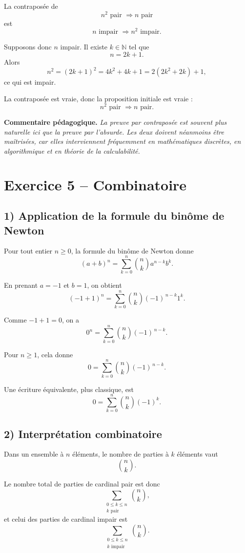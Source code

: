 \documentclass[12pt,a4paper]{article}
\newenvironment{pedago}
{\par\smallskip\noindent\textbf{Commentaire pédagogique. }\itshape}
{\par\smallskip}
\begin{document}
La contraposée de
\[
n^2\text{ pair } \Longrightarrow n\text{ pair}
\]
est
\[
n\text{ impair } \Longrightarrow n^2\text{ impair}.
\]

Supposons donc $n$ impair. Il existe $k\in\mathbb N$ tel que
\[
n=2k+1.
\]
Alors
\[
n^2=(2k+1)^2=4k^2+4k+1=2(2k^2+2k)+1,
\]
ce qui est impair.

La contraposée est vraie, donc la proposition initiale est vraie :
\[
\boxed{n^2\text{ pair } \Longrightarrow n\text{ pair}.}
\]

\begin{pedago}
La preuve par contraposée est souvent plus naturelle ici que la preuve par l'absurde. Les deux doivent néanmoins être maîtrisées, car elles interviennent fréquemment en mathématiques discrètes, en algorithmique et en théorie de la calculabilité.
\end{pedago}

\bigskip

\section*{Exercice 5 -- Combinatoire}

\subsection*{1) Application de la formule du binôme de Newton}

Pour tout entier $n\ge 0$, la formule du binôme de Newton donne
\[
(a+b)^n=\sum_{k=0}^n \binom{n}{k} a^{n-k}b^k.
\]

En prenant $a=-1$ et $b=1$, on obtient
\[
(-1+1)^n=\sum_{k=0}^n \binom{n}{k} (-1)^{\,n-k}1^k.
\]

Comme $-1+1=0$, on a
\[
0^n=\sum_{k=0}^n \binom{n}{k} (-1)^{\,n-k}.
\]

Pour $n\ge 1$, cela donne
\[
0=\sum_{k=0}^n \binom{n}{k} (-1)^{\,n-k}.
\]

Une écriture équivalente, plus classique, est
\[
0=\sum_{k=0}^n \binom{n}{k} (-1)^k.
\]

\subsection*{2) Interprétation combinatoire}

Dans un ensemble à $n$ éléments, le nombre de parties à $k$ éléments vaut
\[
\binom{n}{k}.
\]

Le nombre total de parties de cardinal pair est donc
\[
\sum_{\substack{0\le k\le n\\ k\text{ pair}}} \binom{n}{k},
\]
et celui des parties de cardinal impair est
\[
\sum_{\substack{0\le k\le n\\ k\text{ impair}}} \binom{n}{k}.
\]
\end{document}
